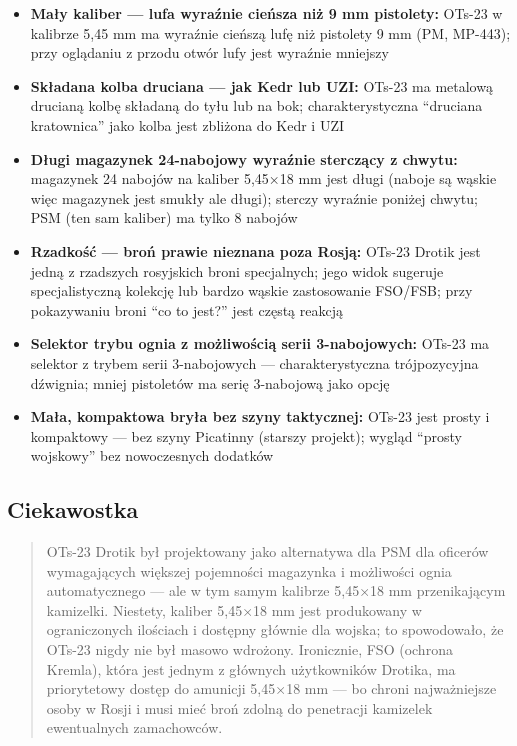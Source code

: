 \documentclass[12pt,oneside]{book}
\providecommand{\tightlist}{%
  \setlength{\itemsep}{0pt}\setlength{\parskip}{0pt}}
\begin{document}
\begin{itemize}
\tightlist
\item
  \textbf{Mały kaliber --- lufa wyraźnie cieńsza niż 9 mm pistolety:}
  OTs-23 w kalibrze 5,45 mm ma wyraźnie cieńszą lufę niż pistolety 9 mm
  (PM, MP-443); przy oglądaniu z przodu otwór lufy jest wyraźnie
  mniejszy
\item
  \textbf{Składana kolba druciana --- jak Kedr lub UZI:} OTs-23 ma
  metalową drucianą kolbę składaną do tyłu lub na bok; charakterystyczna
  ``druciana kratownica'' jako kolba jest zbliżona do Kedr i UZI
\item
  \textbf{Długi magazynek 24-nabojowy wyraźnie sterczący z chwytu:}
  magazynek 24 nabojów na kaliber 5,45×18 mm jest długi (naboje są
  wąskie więc magazynek jest smukły ale długi); sterczy wyraźnie poniżej
  chwytu; PSM (ten sam kaliber) ma tylko 8 nabojów
\item
  \textbf{Rzadkość --- broń prawie nieznana poza Rosją:} OTs-23 Drotik
  jest jedną z rzadszych rosyjskich broni specjalnych; jego widok
  sugeruje specjalistyczną kolekcję lub bardzo wąskie zastosowanie
  FSO/FSB; przy pokazywaniu broni ``co to jest?'' jest częstą reakcją
\item
  \textbf{Selektor trybu ognia z możliwością serii 3-nabojowych:} OTs-23
  ma selektor z trybem serii 3-nabojowych --- charakterystyczna
  trójpozycyjna dźwignia; mniej pistoletów ma serię 3-nabojową jako
  opcję
\item
  \textbf{Mała, kompaktowa bryła bez szyny taktycznej:} OTs-23 jest
  prosty i kompaktowy --- bez szyny Picatinny (starszy projekt); wygląd
  ``prosty wojskowy'' bez nowoczesnych dodatków
\end{itemize}

\subsection{Ciekawostka}\label{ciekawostka-110}

\begin{quote}
OTs-23 Drotik był projektowany jako alternatywa dla PSM dla oficerów
wymagających większej pojemności magazynka i możliwości ognia
automatycznego --- ale w tym samym kalibrze 5,45×18 mm przenikającym
kamizelki. Niestety, kaliber 5,45×18 mm jest produkowany w ograniczonych
ilościach i dostępny głównie dla wojska; to spowodowało, że OTs-23 nigdy
nie był masowo wdrożony. Ironicznie, FSO (ochrona Kremla), która jest
jednym z głównych użytkowników Drotika, ma priorytetowy dostęp do
amunicji 5,45×18 mm --- bo chroni najważniejsze osoby w Rosji i musi
mieć broń zdolną do penetracji kamizelek ewentualnych zamachowców.
\end{quote}
\end{document}
